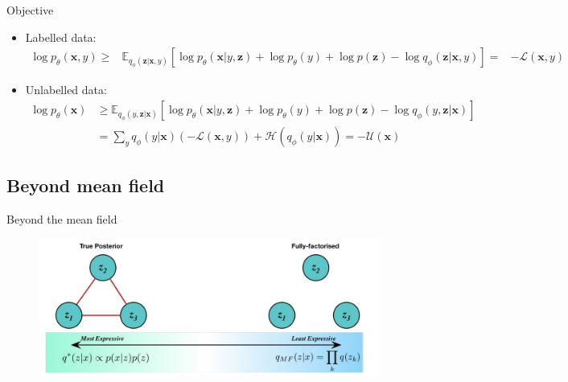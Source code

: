 \begin{frame}{Objective}
\footnotesize{
\begin{itemize}

\item Labelled data: \\
\begin{equation}
\begin{aligned}
\log p_{\theta}(\mathbf{x}, y) \geq & \mathbb{E}_{q_{\phi}(\mathbf{z} | \mathbf{x}, y)}\left[\log p_{\theta}(\mathbf{x} | y, \mathbf{z})+\log p_{\theta}(y)+\log p(\mathbf{z})-\log q_{\phi}(\mathbf{z} | \mathbf{x}, y)\right]
= & -\mathcal{L}(\mathbf{x}, y)
\end{aligned}
\end{equation}
\item Unlabelled data: \\
\begin{equation}
\begin{aligned} 
\log p_{\theta}(\mathbf{x}) & \geq \mathbb{E}_{q_{\phi}(y, \mathbf{z} | \mathbf{x})}\left[\log p_{\theta}(\mathbf{x} | y, \mathbf{z})+\log p_{\theta}(y)+\log p(\mathbf{z})-\log q_{\phi}(y, \mathbf{z} | \mathbf{x})\right] \\ 
&=\sum_{y} q_{\phi}(y | \mathbf{x})(-\mathcal{L}(\mathbf{x}, y))+\mathcal{H}\left(q_{\phi}(y | \mathbf{x})\right)=-\mathcal{U}(\mathbf{x})
\end{aligned}
\end{equation}
\end{itemize}
}
\end{frame}


\subsection{Beyond mean field}

\begin{frame}{Beyond the mean field}
\begin{figure}
\includegraphics[scale=0.25]{struct2meanfield}
\end{figure}
\end{frame}

